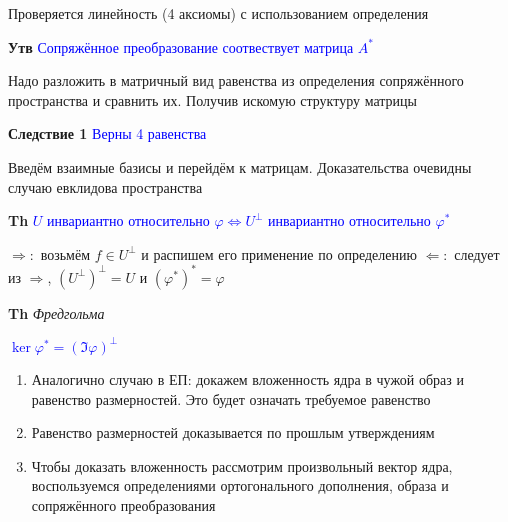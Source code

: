 \documentclass[a4paper, 14pt]{article}
\begin{document}
    Проверяется линейность (4 аксиомы) с использованием определения

    \textbf{Утв} \textcolor{blue}{Сопряжённое преобразование соотвествует матрица $A^*$}

    Надо разложить в матричный вид равенства из определения сопряжённого пространства и сравнить их.
    Получив искомую структуру матрицы

    \textbf{Следствие 1} \textcolor{blue}{Верны 4 равенства}

    Введём взаимные базисы и перейдём к матрицам.
    Доказательства очевидны случаю евклидова пространства

    \textbf{Th} \textcolor{blue}{$U$ инвариантно относительно $\varphi \Leftrightarrow U^\bot$ инвариантно относительно $\varphi^*$}

    $\Rightarrow:$ возьмём $f \in U^\bot$ и распишем его применение по определению
    $\Leftarrow:$ следует из $\Rightarrow$, $(U^\bot)^\bot = U$ и $(\varphi^*)^* = \varphi$

    \textbf{Th} \textit{Фредгольма}

    \textcolor{blue}{$\ker \varphi^* = (\Im \varphi)^\bot$}

    \begin{enumerate}
        \item Аналогично случаю в ЕП: докажем вложенность ядра в чужой образ и равенство размерностей.
        Это будет означать требуемое равенство
        \item Равенство размерностей доказывается по прошлым утверждениям
        \item Чтобы доказать вложенность рассмотрим произвольный вектор ядра, воспользуемся определениями
        ортогонального дополнения, образа и сопряжённого преобразования
    \end{enumerate}
\end{document}

